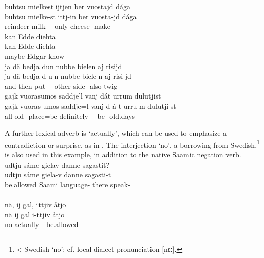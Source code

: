 \ea\label{ADVsEx1}%
\glll	buhtsu mielkest ijtjen ber vuostajd dága\\
	buhtsu mielke-st ittj-in ber vuosta-jd dága\\
	reindeer\BS{} milk- - only cheese- make\BS{}\\\nopagebreak
{}	
\z
\ea\label{ADVsEx3}%
\glll	kan Edde diehta\\
	kan Edde diehta\\
	maybe Edgar\BS{} know\BS{}\\\nopagebreak
{}	
\z
\ea\label{ADVsEx3b}%
\glll	ja dä bedja dun nubbe bielen aj risijd\\
	ja dä bedja d-u-n nubbe biele-n aj risi-jd\\
	and then put\BS{} -- other side- also twig-\\\nopagebreak
{}	
\z
\ea\label{ADVsEx5}
\glll	gajk vuorasumos saddje'l vanj dát urrum dulutjist\\
	gajk vuoras-umos saddje=l vanj d-á-t urru-m dulutji-st\\
	all old- place\BS{}=be\BS{} definitely -- be- old.days-\\\nopagebreak
{}	
\z

A further lexical adverb is  ‘actually’, which can be used to emphasize a contradiction or surprise, as in . The interjection  ‘no’, a borrowing from Swedish,\footnote{< Swedish  ‘no’; cf. local dialect pronunciation [nɛː].} 
is also used in this example, in addition to the native Saamic negation verb. 
\ea\label{particleEx6}
\glll	{} udtju sáme gielav danne sagastit?\\
	{} udtju sáme giela-v danne sagasti-t\\
	{} be.allowed\BS{} Saami\BS{} language- there speak-\\\nopagebreak
{}\\
\glll	{} nä, ij gal, ittjiv åtjo\\
	{} nä ij gal i-ttjiv åtjo\\
	{} no \BS{} actually - be.allowed\BS{}\\\nopagebreak
{}	
\z

